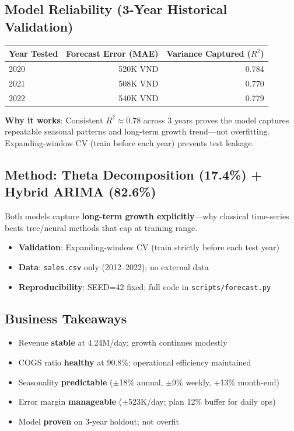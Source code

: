 \documentclass[12pt,a4paper]{article}
\begin{document}
\subsection*{Model Reliability (3-Year Historical Validation)}

\begin{table}[h!]
\centering
\small
\begin{tabular}{lrr}
\toprule
\textbf{Year Tested} & \textbf{Forecast Error (MAE)} & \textbf{Variance Captured ($R^2$)} \\
\midrule
2020 & 520K VND & 0.784 \\
2021 & 508K VND & 0.770 \\
2022 & 540K VND & 0.779 \\
\bottomrule
\end{tabular}
\end{table}

\noindent\textbf{Why it works}: Consistent $R^2 \approx 0.78$ across 3 years proves the model captures repeatable seasonal patterns and long-term growth trend—not overfitting. Expanding-window CV (train before each year) prevents test leakage.

\subsection*{Method: Theta Decomposition (17.4\%) + Hybrid ARIMA (82.6\%)}

Both models capture \textbf{long-term growth explicitly}—why classical time-series beats tree/neural methods that cap at training range.

\begin{itemize}
  \item \textbf{Validation}: Expanding-window CV (train strictly before each test year)
  \item \textbf{Data}: \texttt{sales.csv} only (2012--2022); no external data
  \item \textbf{Reproducibility}: SEED=42 fixed; full code in \texttt{scripts/forecast.py}
\end{itemize}

\subsection*{Business Takeaways}

\begin{itemize}
  \item[\checkmark] Revenue \textbf{stable} at 4.24M/day; growth continues modestly
  \item[\checkmark] COGS ratio \textbf{healthy} at 90.8\%; operational efficiency maintained
  \item[\checkmark] Seasonality \textbf{predictable} ($\pm$18\% annual, $\pm$9\% weekly, +13\% month-end)
  \item[\checkmark] Error margin \textbf{manageable} ($\pm$523K/day; plan 12\% buffer for daily ops)
  \item[\checkmark] Model \textbf{proven} on 3-year holdout; not overfit
\end{itemize}
\end{document}
